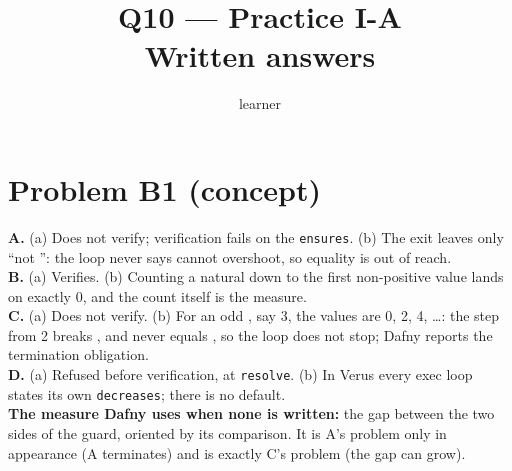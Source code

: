 \documentclass[11pt]{article}
\title{Q10 --- Practice I-A \\ \large Written answers}
\author{learner}
\date{}
\begin{document}
\maketitle
\sloppy

\section*{Problem B1 (concept)}\label{ans:B1}
\begin{answer}
\textbf{A.} (a) Does not verify; verification fails on the \texttt{ensures}.
\quad (b) The exit leaves only ``not '': the loop never says
 cannot overshoot, so equality is out of reach. \\
\textbf{B.} (a) Verifies. \quad (b) Counting a natural down to the first
non-positive value lands on exactly 0, and the count itself is the
measure. \\
\textbf{C.} (a) Does not verify. \quad (b) For an odd , say 3, the
values are 0, 2, 4, \dots: the step from 2 breaks , and 
never equals , so the loop does not stop; Dafny reports the
termination obligation. \\
\textbf{D.} (a) Refused before verification, at \texttt{resolve}. \quad (b)
In Verus every exec loop states its own \texttt{decreases}; there is no
default. \\
\textbf{The measure Dafny uses when none is written:} the gap between the
two sides of the guard, oriented by its comparison. It is A's problem only in
appearance (A terminates) and is exactly C's problem (the gap can grow).
\end{answer}

\end{document}
